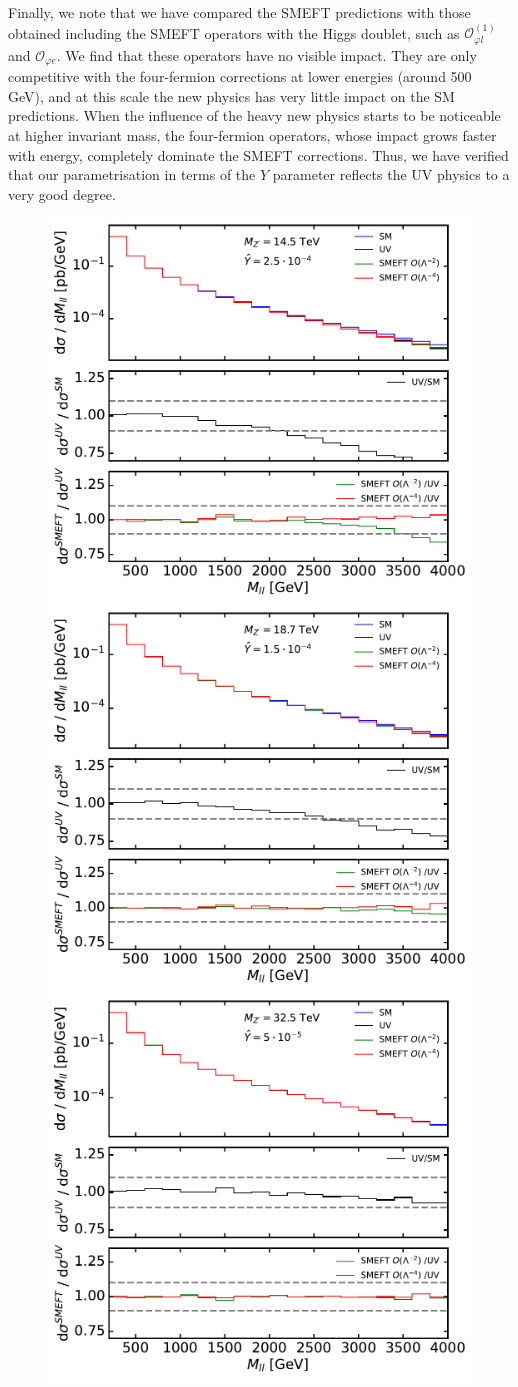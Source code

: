 \documentclass[withindex,glossary]{cam-thesis}
\begin{document}
Finally, we note that we have compared the SMEFT predictions with 
those obtained 
including the SMEFT operators with the Higgs doublet, such as $\mathcal{O}_{\varphi l}^{(1)}$ and $\mathcal{O}_{\varphi e}$. We find that these operators have no visible impact. 
They are only competitive with the four-fermion corrections at lower energies (around 500 GeV),
and at this scale the new physics has very little impact on the SM predictions. 
When the influence of the heavy new physics starts to be noticeable at higher invariant mass, the four-fermion operators, whose impact grows faster with energy, completely dominate the SMEFT corrections. Thus, we have verified that our parametrisation
in terms of the $\hat{Y}$ parameter reflects the UV physics to a very good degree.
%
\begin{figure}[htb]
    \centering
	\includegraphics[width=0.49\linewidth]{Figures/Zp_14.51TeV_Y_0.00025.pdf}
	\includegraphics[width=0.49\linewidth]{Figures/Zp_18.73TeV_Y_0.00015.pdf}\\
	\includegraphics[width=0.49\linewidth]{Figures/Zp_32.45TeV_Y_0.00005.pdf}

\end{figure}
\end{document}
